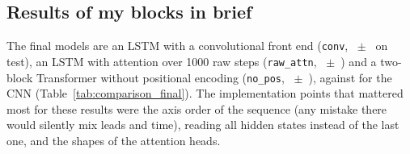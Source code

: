 

\subsection{Results of my blocks in brief}

The final models are an LSTM with a convolutional front end (\texttt{conv},
\rnnFinalTestMacroAurocMean{}~$\pm$~\rnnFinalTestMacroAurocSd{} on test), an LSTM with attention over 1000 raw
steps (\texttt{raw\_attn}, \rnnAttnfinalTestMacroAurocMean{}~$\pm$~\rnnAttnfinalTestMacroAurocSd{}) and a
two-block Transformer without positional encoding (\texttt{no\_pos},
\transformerFinalTestMacroAurocMean{}~$\pm$~\transformerFinalTestMacroAurocSd{}), against
\cnnFinalTestMacroAurocMean{} for the CNN (Table~\ref{tab:comparison_final}). The implementation points that
mattered most for these results were the axis order of the sequence (any mistake there would silently mix
leads and time), reading all hidden states instead of the last one, and the shapes of the attention heads.
